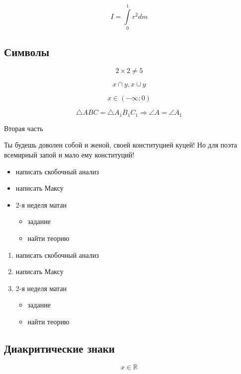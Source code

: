 \documentclass[a4paper,12pt]{article} %
\begin{document}
\[I=\int\limits_{0}^{1} r^2dm \]

\subsection{Символы}

\[2\times 2\neq 5 \]

\[x \cap y,  x \cup y\]

\[x\in (-\infty; 0)\]

\[ \triangle ABC = \triangle A_1B_1C_1 \Rightarrow \angle A= \angle A_1\]

\smiley


\newpage
\begin{center}
Вторая часть
\end{center}

\begin{flushright}
Ты будешь доволен собой и женой, своей конституцией куцей!
Но для поэта всемирный запой и мало ему конституций!
\end{flushright}


\begin{itemize}
\item написать скобочный анализ
\item написать Максу
\item 2-я неделя матан
\begin{itemize}
\item задание
\item найти теорию
\end{itemize}
\end{itemize}


\begin{enumerate}
\item написать скобочный анализ
\item написать Максу
\item 2-я неделя матан
\begin{itemize}
\item задание
\item найти теорию
\end{itemize}
\end{enumerate}

\subsection{Диакритические знаки}


\[x\in \mathbb{R} \]
\end{document}
